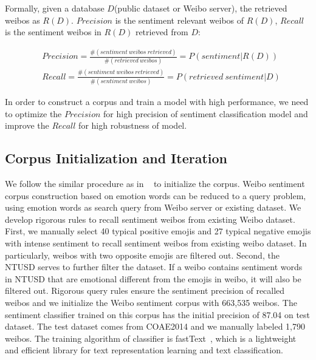 \documentclass[runningheads]{llncs}
\begin{document}
\begin{myDef}
Formally, given a database $D$(public dataset or Weibo server), the retrieved weibos as $R(D)$.  $Precision$ is the sentiment relevant weibos of $R(D)$, $Recall$ is the sentiment weibos in $R(D)$ retrieved from $D$:

\scriptsize{ %
\begin{align}
&Precision = \frac{\#\left ( sentiment\ weibos\ retrieved \right )}{\#\left ( retrieved\ weibos \right )} = P\left ( sentiment | R(D) \right ) \\
&Recall = \frac{\#\left ( sentiment\ weibos\ retrieved \right )}{\#\left ( sentiment\ weibos \right )} = P\left (retrieved\ sentiment | D\right )
\end{align}
} %
\end{myDef}

In order to construct a corpus and train a model with high performance, we need to optimize the $Precision$ for high precision of sentiment classification model and improve the $Recall$ for high robustness of model.

\subsection{Corpus Initialization and Iteration}

We follow the similar procedure as in ~\cite{go2009twitter} to initialize the corpus. Weibo sentiment corpus construction based on emotion words can be reduced to a query problem, using emotion words as search query from Weibo server or existing dataset. We develop rigorous rules to recall sentiment weibos from existing Weibo dataset. First, we manually select 40 typical positive emojis and 27 typical negative emojis with intense sentiment to recall sentiment weibos from existing weibo dataset. In particularly, weibos with two opposite emojis are filtered out. Second, the NTUSD serves to further filter the dataset. If a weibo contains sentiment words in NTUSD that are emotional different from the emojis in weibo, it will also be filtered out. Rigorous query rules ensure the sentiment precision of recalled weibos and we initialize the Weibo sentiment corpus with 663,535 weibos. The sentiment classifier trained on this corpus has the initial precision of 87.04 on test dataset. The test dataset comes from COAE2014 and we manually labeled 1,790 weibos. The training algorithm of classifier is fastText~\cite{joulin2016bag}, which is a lightweight and efficient library for text representation learning and text classification.
\end{document}
